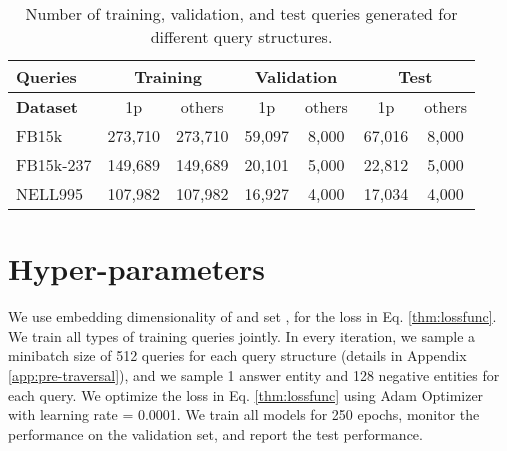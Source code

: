 \begin{table*}[t]
\centering
\small
{}
\caption{Knowledge graph dataset statistics as well as the split into training, validation, and test sets.}
\label{tab:meta_kg}
\end{table*}

\begin{table*}[t]
\centering
\small
\begin{tabular}{|l|c|c|c|c|c|c|}
\hline
         \textbf{Queries} & \multicolumn{2}{c|}{\textbf{Training}} & \multicolumn{2}{c|}{\textbf{Validation}} & \multicolumn{2}{c|}{\textbf{Test}} \\ \hline
\textbf{Dataset}     & 1p               & others           & 1p              & others          & 1p               & others          \\ \hline
FB15k     & 273,710          & 273,710          & 59,097          & 8,000           & 67,016           & 8,000           \\ \hline
FB15k-237 & 149,689          & 149,689          & 20,101          & 5,000           & 22,812           & 5,000           \\ \hline
NELL995     & 107,982          & 107,982          & 16,927          & 4,000           & 17,034           & 4,000           \\ \hline
\end{tabular}
\caption{Number of training, validation, and test queries generated for different query structures.}
\label{tab:meta_query}
\end{table*}

\section{Hyper-parameters} \label{app:expdetails}
We use embedding dimensionality of  and set ,  for the loss in Eq. \ref{thm:lossfunc}. We train all types of training queries jointly. In every iteration, we sample a minibatch size of 512 queries for each query structure (details in Appendix \ref{app:pre-traversal}), and we sample 1 answer entity and 128 negative entities for each query. We optimize the loss in Eq. \ref{thm:lossfunc} using Adam Optimizer \citep{kingma2014adam} with learning rate = 0.0001. We train all models for 250 epochs, monitor the performance on the validation set, and report the test performance.

